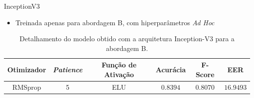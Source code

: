 \begin{frame}{InceptionV3}

  \begin{itemize}
    \item Treinada apenas para abordagem B, com hiperparâmetros \emph{Ad Hoc}
  \end{itemize}

  \begin{table}[h!]
    \centering
    \caption{Detalhamento do modelo obtido com a arquitetura Inception-V3 para a abordagem B.}
    \label{tab:inception}
    \begin{tabular}{cccccc}
    \toprule
    \textbf{Otimizador} & \textbf{\emph{Patience}}  & \textbf{Função de Ativação} & \textbf{Acurácia} & \textbf{F-Score} & \textbf{EER} \\
    \midrule
    RMSprop & 5 & ELU & $0.8394$ & $0.8070$ & $16.9493$ \\
    \bottomrule
    \end{tabular}
    \end{table}

\end{frame}

